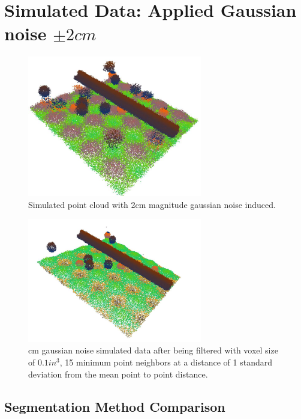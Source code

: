 \documentclass[12pt]{drexelthesis}
\let\Oldsection\section
\renewcommand{\section}{\FloatBarrier\Oldsection}
\let\Oldsubsection\subsection
\renewcommand{\subsection}{\FloatBarrier\Oldsubsection}
\begin{document}
\section{Simulated Data: Applied Gaussian noise $\pm 2 cm$}
\begin{figure}[!ht] 
	
	\centering
		\includegraphics[width=3in]{simulated-lab-scan/2cmnoise/rawcloud.jpg}
		\caption[Simulated point cloud with 2cm magnitude gaussian noise induced]{\centering  Simulated point cloud with 2cm magnitude gaussian noise induced.}
\label{2cmnoise:raw}
\end{figure}

\begin{figure}[!ht]
	
	\centering
		\includegraphics[width=3in]{simulated-lab-scan/2cmnoise/DS01k15std1.jpg}
		\caption[2 cm gaussian noise simulated data after being filtered with voxel size of 0.1 $in^{3}$, 15 minimum point neighbors at a distance of 1 standard deviation from the mean point to point distance]{ cm gaussian noise simulated data after being filtered with voxel size of $0.1 in^{3}$, 15 minimum point neighbors at a distance of 1 standard deviation from the mean point to point distance.}
\label{2cmnoise:filtered}
\end{figure}

\subsection{Segmentation Method Comparison}
\end{document}
